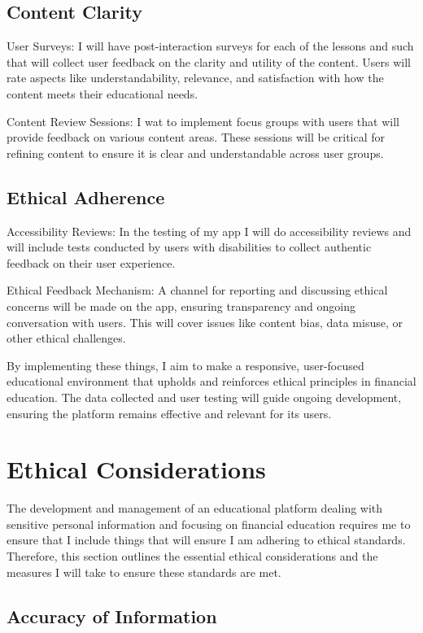 \documentclass[12pt,twocolumn]{article}
\begin{document}
\subsection{Content Clarity}

User Surveys: I will have post-interaction surveys for each of the lessons and such that will collect user feedback on the clarity and utility of the content. Users will rate aspects like understandability, relevance, and satisfaction with how the content meets their educational needs.

Content Review Sessions: I wat to implement focus groups with users that will provide feedback on various content areas. These sessions will be critical for refining content to ensure it is clear and understandable across user groups.

\subsection{Ethical Adherence}

Accessibility Reviews: In the testing of my app I will do accessibility reviews and will include tests conducted by users with disabilities to collect authentic feedback on their user experience.

Ethical Feedback Mechanism: A  channel for reporting and discussing ethical concerns will be made on the app, ensuring transparency and ongoing conversation with users. This will cover issues like content bias, data misuse, or other ethical challenges.


By implementing these things, I aim to make a responsive, user-focused educational environment that upholds and reinforces ethical principles in financial education. The data collected and user testing will guide ongoing development, ensuring the platform remains effective and relevant for its users.


\section{Ethical Considerations}

The development and management of an educational platform dealing with sensitive personal information and focusing on financial education requires me to ensure that I include things that will ensure I am adhering to ethical standards. Therefore, this section outlines the essential ethical considerations and the  measures I will take to ensure these standards are  met.

\subsection{Accuracy of Information}
\end{document}
